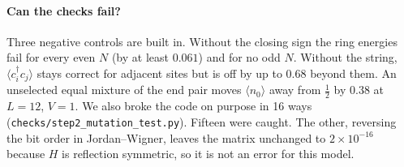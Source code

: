 \documentclass[11pt,a4paper]{article}
\newcommand{\dg}{^{\dagger}}
\begin{document}
\paragraph{Can the checks fail?}
Three negative controls are built in.
Without the closing sign the ring energies fail for every even $N$ (by at least $0.061$) and for no odd $N$.
Without the string, $\langle c_i\dg c_j\rangle$ stays correct for adjacent sites but is off by up to $0.68$ beyond them.
An unselected equal mixture of the end pair moves $\langle n_0\rangle$ away from $\tfrac12$ by $0.38$ at $L=12$, $V=1$.
We also broke the code on purpose in 16 ways (\texttt{checks/step2\_mutation\_test.py}).
Fifteen were caught.
The other, reversing the bit order in Jordan--Wigner, leaves the matrix unchanged to $2\times10^{-16}$ because $H$ is reflection symmetric, so it is not an error for this model.
\end{document}
